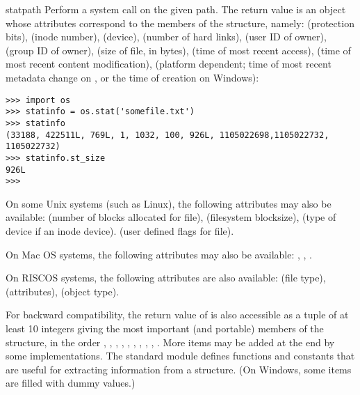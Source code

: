 \begin{funcdesc}{stat}{path}
Perform a  system call on the given path.  The
return value is an object whose attributes correspond to the members of
the  structure, namely:
 (protection bits),
 (inode number),
 (device),
 (number of hard links),
 (user ID of owner),
 (group ID of owner),
 (size of file, in bytes),
 (time of most recent access),
 (time of most recent content modification),
(platform dependent; time of most recent metadata change on \UNIX, or
the time of creation on Windows):

\begin{verbatim}
>>> import os
>>> statinfo = os.stat('somefile.txt')
>>> statinfo
(33188, 422511L, 769L, 1, 1032, 100, 926L, 1105022698,1105022732, 1105022732)
>>> statinfo.st_size
926L
>>>
\end{verbatim}


On some Unix systems (such as Linux), the following attributes may
also be available:
 (number of blocks allocated for file),
 (filesystem blocksize),
 (type of device if an inode device).
 (user defined flags for file).

On Mac OS systems, the following attributes may also be available:
,
,
.

On RISCOS systems, the following attributes are also available:
 (file type),
 (attributes),
 (object type).

For backward compatibility, the return value of  is
also accessible as a tuple of at least 10 integers giving the most
important (and portable) members of the  structure, in the
order
,
,
,
,
,
,
,
,
,
.
More items may be added at the end by some implementations.
The standard module  defines
functions and constants that are useful for extracting information
from a  structure.
(On Windows, some items are filled with dummy values.)


\end{funcdesc}
